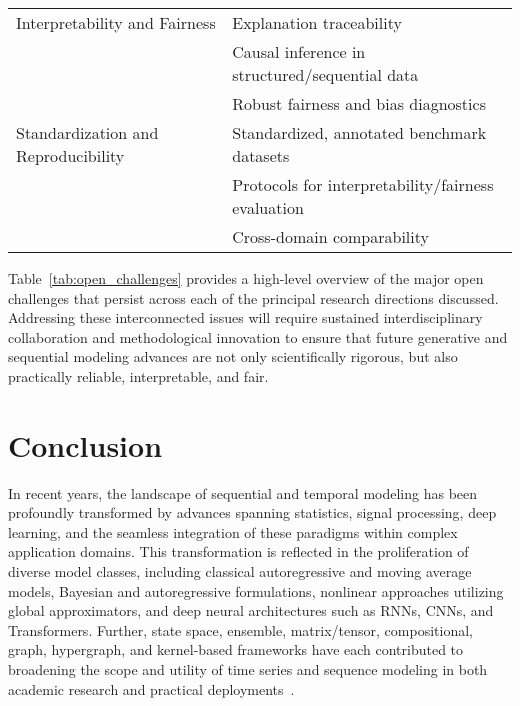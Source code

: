 \begin{table*}[htbp]
\begin{adjustbox}{max width=\textwidth}
\begin{tabular}{>{\raggedright\arraybackslash}p{4.2cm} >{\raggedright\arraybackslash}p{12.8cm}}
\addlinespace
Interpretability and Fairness &
Explanation traceability \\
& Causal inference in structured/sequential data \\
& Robust fairness and bias diagnostics \\
\addlinespace
Standardization and Reproducibility &
Standardized, annotated benchmark datasets \\
& Protocols for interpretability/fairness evaluation \\
& Cross-domain comparability \\
\bottomrule
\end{tabular}
\end{adjustbox}
\end{table*}

Table~\ref{tab:open_challenges} provides a high-level overview of the major open challenges that persist across each of the principal research directions discussed. Addressing these interconnected issues will require sustained interdisciplinary collaboration and methodological innovation to ensure that future generative and sequential modeling advances are not only scientifically rigorous, but also practically reliable, interpretable, and fair.

\section{Conclusion}

In recent years, the landscape of sequential and temporal modeling has been profoundly transformed by advances spanning statistics, signal processing, deep learning, and the seamless integration of these paradigms within complex application domains. This transformation is reflected in the proliferation of diverse model classes, including classical autoregressive and moving average models, Bayesian and autoregressive formulations, nonlinear approaches utilizing global approximators, and deep neural architectures such as RNNs, CNNs, and Transformers. Further, state space, ensemble, matrix/tensor, compositional, graph, hypergraph, and kernel-based frameworks have each contributed to broadening the scope and utility of time series and sequence modeling in both academic research and practical deployments~\cite{ref2,ref7,ref8,ref10,ref11,ref14,ref15,ref16,ref19,ref20,ref24,ref25,ref31,ref32,ref33,ref34,ref35,ref37,ref38,ref39,ref40,ref51,ref55,ref62,ref63,ref64,ref66,ref67,ref73,ref75,ref79,ref83,ref84,ref85,ref86,ref87}.

